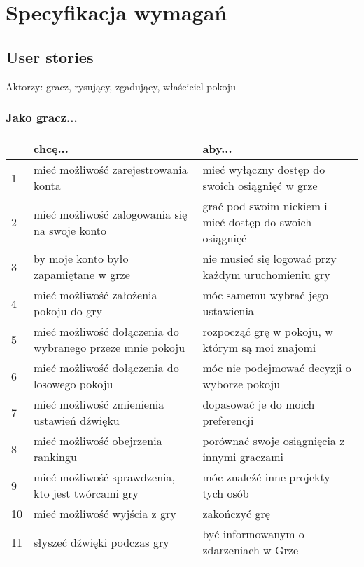 \chapter{Specyfikacja wymagań}
\section{User stories}
Aktorzy: gracz, rysujący, zgadujący, właściciel pokoju
\subsection{Jako gracz...}
\begin{center}
    \begin{tabular}{ | l | p{6cm} | p{6cm} |}
    \hline
     & \textbf{chcę...} & \textbf{aby...} \\ \hline
    1 & mieć możliwość zarejestrowania konta & mieć wyłączny dostęp do swoich osiągnięć w grze \\ \hline
    2 & mieć możliwość zalogowania się na swoje konto & grać pod swoim nickiem i mieć dostęp do swoich osiągnięć \\ \hline
    3 & by moje konto było zapamiętane w grze & nie musieć się logować przy każdym uruchomieniu gry \\ \hline
    4 & mieć możliwość założenia pokoju do gry & móc samemu wybrać jego ustawienia \\ \hline
    5 & mieć możliwość dołączenia do wybranego przeze mnie pokoju & rozpocząć grę w pokoju, w którym są moi znajomi \\ \hline
    6 & mieć możliwość dołączenia do losowego pokoju & móc nie podejmować decyzji o wyborze pokoju \\ \hline
    7 & mieć możliwość zmienienia ustawień dźwięku & dopasować je do moich preferencji \\ \hline
    8 & mieć możliwość obejrzenia rankingu & porównać swoje osiągnięcia z innymi graczami \\ \hline
    9 & mieć możliwość sprawdzenia, kto jest twórcami gry & móc znaleźć inne projekty tych osób \\ \hline
    10 & mieć możliwość wyjścia z gry & zakończyć grę \\ \hline
    11 & słyszeć dźwięki podczas gry & być informowanym o zdarzeniach w Grze \\ \hline
    \end{tabular}
\end{center}

